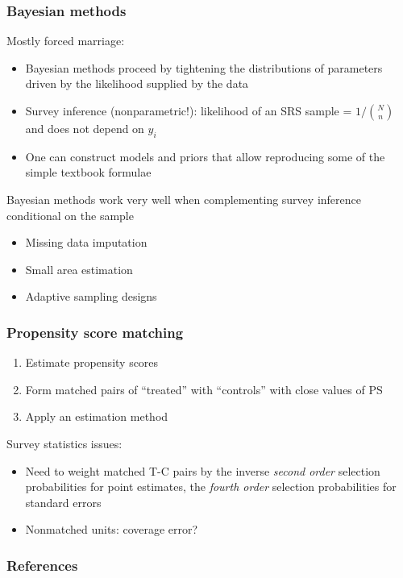 \documentclass{beamer}
\begin{document}
\begin{frame}\frametitle{Bayesian methods}

Mostly forced marriage:
\begin{itemize}
    \item Bayesian methods proceed by tightening the distributions of parameters
        driven by the likelihood supplied by the data
    \item Survey inference (nonparametric!): likelihood of an SRS sample = $1/{N \choose n}$ and does not depend on $y_i$
    \item One can construct models and priors that allow reproducing some of the simple
        textbook formulae \citep{little:2012}
\end{itemize}

Bayesian methods work very well when complementing survey inference conditional on the sample
\begin{itemize}
    \item Missing data imputation
    \item Small area estimation
    \item Adaptive sampling designs
\end{itemize}

\end{frame}

\begin{frame}\frametitle{Propensity score matching}

\begin{enumerate}
    \item Estimate propensity scores
    \item Form matched pairs of ``treated'' with ``controls'' with close values of PS
    \item Apply an estimation method
\end{enumerate}

\medskip

Survey statistics issues:

\begin{itemize}
    \item Need to weight matched T-C pairs by the inverse 
        \textit{second order} selection probabilities for point estimates,
        the \textit{fourth order} selection probabilities for standard errors
    \item Nonmatched units: coverage error?
\end{itemize}

\end{frame}



\begin{frame}[allowframebreaks]\frametitle{References}




\end{frame}
\end{document}

